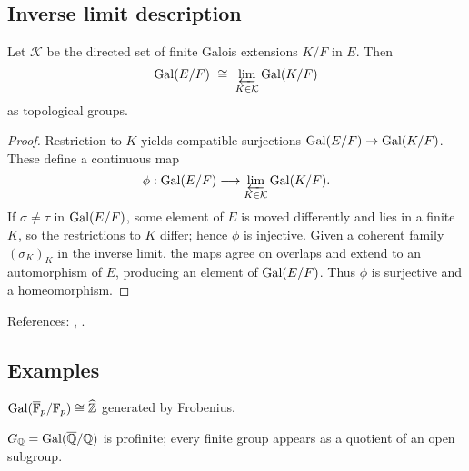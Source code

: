 \subsection{Inverse limit description}
\begin{theorem}
Let $\mathcal{K}$ be the directed set of finite Galois extensions $K/F$ in $E$. Then
\[
\Gal(E/F)\ \cong\ \varprojlim_{K\in\mathcal{K}} \Gal(K/F)
\]
as topological groups.
\end{theorem}
\begin{proof}
Restriction to $K$ yields compatible surjections $\operatorname{Gal}(E/F)\to\operatorname{Gal}(K/F)$. These define a continuous map
\[
\phi:\operatorname{Gal}(E/F)\longrightarrow\varprojlim_{K\in\mathcal{K}}\operatorname{Gal}(K/F).
\]
If $\sigma\ne\tau$ in $\operatorname{Gal}(E/F)$, some element of $E$ is moved differently and lies in a finite $K$, so the restrictions to $K$ differ; hence $\phi$ is injective. Given a coherent family $(\sigma_K)_K$ in the inverse limit, the maps agree on overlaps and extend to an automorphism of $E$, producing an element of $\operatorname{Gal}(E/F)$. Thus $\phi$ is surjective and a homeomorphism.
\end{proof}
References: \cite[Ch.~VIII]{Lang}, \cite[Ch.~I]{Neukirch}.

\subsection{Examples}
\begin{example}
$\operatorname{Gal}(\overline{\mathbb{F}}_p/\mathbb{F}_p)\cong\widehat{\mathbb{Z}}$ generated by Frobenius.
\end{example}
\begin{example}
$G_{\mathbb{Q}}=\operatorname{Gal}(\overline{\mathbb{Q}}/\mathbb{Q})$ is profinite; every finite group appears as a quotient of an open subgroup.
\end{example}
